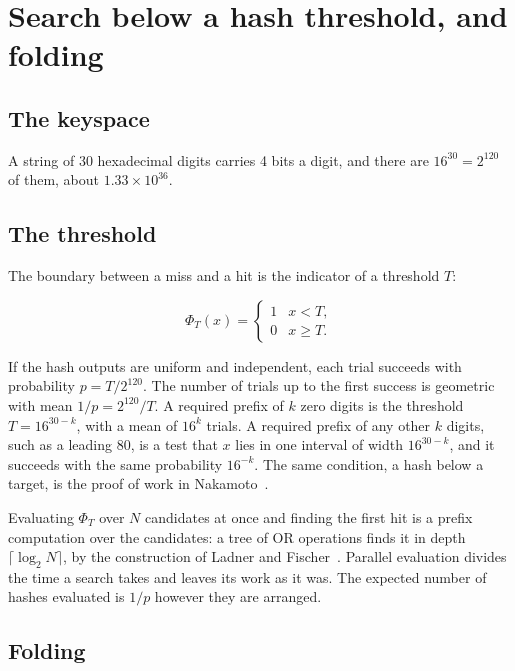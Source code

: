 \chapter{\texorpdfstring{Search below a hash threshold, and folding}{Search below a hash threshold, and folding}}
\label{chap:threshold-search}

\section{\texorpdfstring{The keyspace}{The keyspace}}

A string of 30 hexadecimal digits carries 4 bits a digit, and there are \(16^{30} = 2^{120}\) of them, about \(1.33 \times 10^{36}\).

\section{\texorpdfstring{The threshold}{The threshold}}

The boundary between a miss and a hit is the indicator of a threshold \(T\):

\[
\Phi_T(x) = \begin{cases} 1 & x < T, \\ 0 & x \ge T. \end{cases}
\]

If the hash outputs are uniform and independent, each trial succeeds with probability \(p = T / 2^{120}\). The number of trials up to the first success is geometric with mean \(1/p = 2^{120}/T\). A required prefix of \(k\) zero digits is the threshold \(T = 16^{30-k}\), with a mean of \(16^k\) trials. A required prefix of any other \(k\) digits, such as a leading 80, is a test that \(x\) lies in one interval of width \(16^{30-k}\), and it succeeds with the same probability \(16^{-k}\). The same condition, a hash below a target, is the proof of work in Nakamoto~\cite{src:Nakamoto-2008}.

Evaluating \(\Phi_T\) over \(N\) candidates at once and finding the first hit is a prefix computation over the candidates: a tree of OR operations finds it in depth \(\lceil \log_2 N \rceil\), by the construction of Ladner and Fischer~\cite{src:Ladner-Fischer-1980}. Parallel evaluation divides the time a search takes and leaves its work as it was. The expected number of hashes evaluated is \(1/p\) however they are arranged.

\section{\texorpdfstring{Folding}{Folding}}

